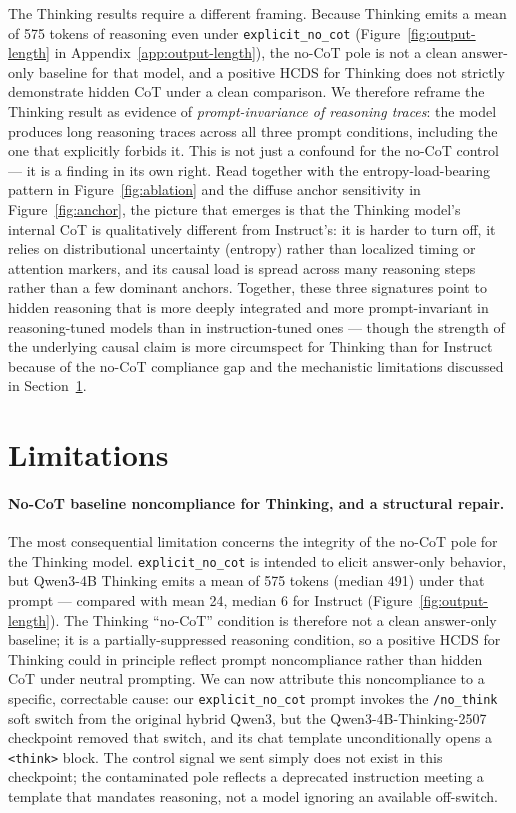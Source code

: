 \documentclass{article}
\theoremstyle{plain}
\theoremstyle{definition}
\theoremstyle{remark}
\begin{document}
The Thinking results require a different framing. Because Thinking emits a mean of 575 tokens of reasoning even under \texttt{explicit\_no\_cot} (Figure~\ref{fig:output-length} in Appendix~\ref{app:output-length}), the no-CoT pole is not a clean answer-only baseline for that model, and a positive HCDS for Thinking does not strictly demonstrate hidden CoT under a clean comparison. We therefore reframe the Thinking result as evidence of \emph{prompt-invariance of reasoning traces}: the model produces long reasoning traces across all three prompt conditions, including the one that explicitly forbids it. This is not just a confound for the no-CoT control --- it is a finding in its own right. Read together with the entropy-load-bearing pattern in Figure~\ref{fig:ablation} and the diffuse anchor sensitivity in Figure~\ref{fig:anchor}, the picture that emerges is that the Thinking model's internal CoT is qualitatively different from Instruct's: it is harder to turn off, it relies on distributional uncertainty (entropy) rather than localized timing or attention markers, and its causal load is spread across many reasoning steps rather than a few dominant anchors. Together, these three signatures point to hidden reasoning that is more deeply integrated and more prompt-invariant in reasoning-tuned models than in instruction-tuned ones --- though the strength of the underlying causal claim is more circumspect for Thinking than for Instruct because of the no-CoT compliance gap and the mechanistic limitations discussed in Section~\ref{sec:limitations}.

\section{Limitations}
\label{sec:limitations}

\paragraph{No-CoT baseline noncompliance for Thinking, and a structural repair.}
The most consequential limitation concerns the integrity of the no-CoT pole for the Thinking model. \texttt{explicit\_no\_cot} is intended to elicit answer-only behavior, but Qwen3-4B Thinking emits a mean of 575 tokens (median 491) under that prompt --- compared with mean 24, median 6 for Instruct (Figure~\ref{fig:output-length}). The Thinking ``no-CoT'' condition is therefore not a clean answer-only baseline; it is a partially-suppressed reasoning condition, so a positive HCDS for Thinking could in principle reflect prompt noncompliance rather than hidden CoT under neutral prompting. We can now attribute this noncompliance to a specific, correctable cause: our \texttt{explicit\_no\_cot} prompt invokes the \texttt{/no\_think} soft switch from the original hybrid Qwen3, but the Qwen3-4B-Thinking-2507 checkpoint removed that switch, and its chat template unconditionally opens a \texttt{\textless think\textgreater} block. The control signal we sent simply does not exist in this checkpoint; the contaminated pole reflects a deprecated instruction meeting a template that mandates reasoning, not a model ignoring an available off-switch.
\end{document}
